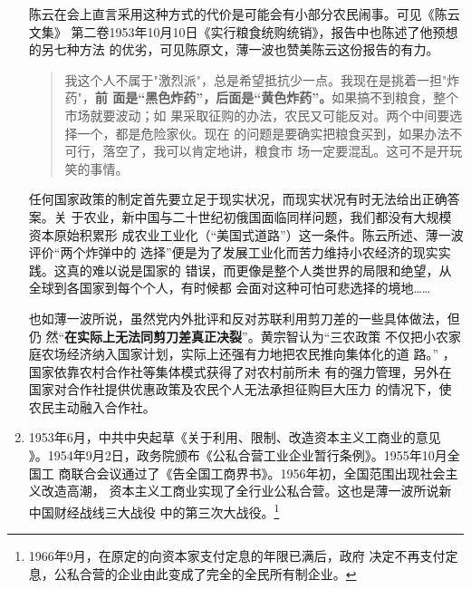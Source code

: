 \begin{enumerate}
  陈云在会上直言采用这种方式的代价是可能会有小部分农民闹事。可见《陈云文集》
  第二卷1953年10月10日《实行粮食统购统销》，报告中也陈述了他预想的另七种方法
  的优劣，可见陈原文，薄一波也赞美陈云这份报告的有力。
  \begin{quotation}
    我这个人不属于"激烈派"，总是希望抵抗少一点。我现在是挑着一担"炸药"，\textbf{前
      面是“黑色炸药”，后面是“黄色炸药”。}如果搞不到粮食，整个市场就要波动；如
    果采取征购的办法，农民又可能反对。两个中间要选择一个，都是危险家伙。现在
    的问题是要确实把粮食买到，如果办法不可行，落空了，我可以肯定地讲，粮食市
    场一定要混乱。这可不是开玩笑的事情。
  \end{quotation}

  任何国家政策的制定首先要立足于现实状况，而现实状况有时无法给出正确答案。关
  于农业，新中国与二十世纪初俄国面临同样问题，我们都没有大规模资本原始积累形
  成农业工业化（“美国式道路”）这一条件。陈云所述、薄一波评价“两个炸弹中的
  选择”便是为了发展工业化而苦力维持小农经济的现实实践。这真的难以说是国家的
  错误，而更像是整个人类世界的局限和绝望，从全球到各国家到每个个人，有时候都
  会面对这种可怕可悲选择的境地……

  也如薄一波所说，虽然党内外批评和反对苏联利用剪刀差的一些具体做法，但仍
  然“\textbf{在实际上无法同剪刀差真正决裂}”。\cite[281]{boyibo}黄宗智认为“三农政策
  不仅把小农家庭农场经济纳入国家计划，实际上还强有力地把农民推向集体化的道
  路。”\cite[175]{sanjiaozhou} ，国家依靠农村合作社等集体模式获得了对农村前所未
  有的强力管理，另外在国家对合作社提供优惠政策及农民个人无法承担征购巨大压力
  的情况下，使农民主动融入合作社。

\item 1953年6月，中共中央起草《关于利用、限制、改造资本主义工商业的意见
  》。1954年9月2日，政务院颁布《公私合营工业企业暂行条例》。1955年10月全国工
  商联合会议通过了《告全国工商界书》。1956年初，全国范围出现社会主义改造高潮，
  资本主义工商业实现了全行业公私合营。这也是薄一波所说新中国财经战线三大战役
  中的第三次大战役。\footnote{1966年9月，在原定的向资本家支付定息的年限已满后，政府
    决定不再支付定息，公私合营的企业由此变成了完全的全民所有制企业。}




\end{enumerate}
